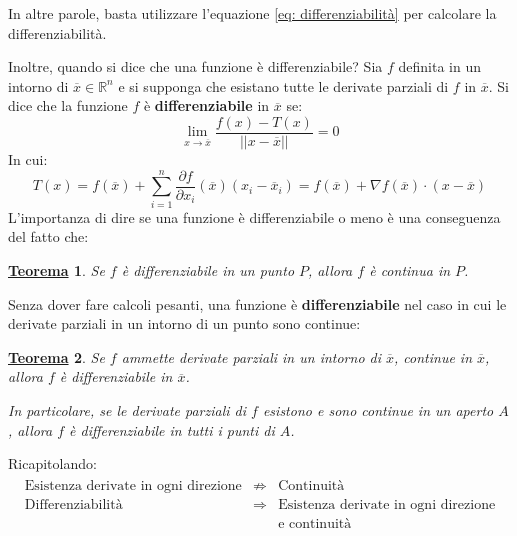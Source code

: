 \documentclass[a4paper]{article}
\newtheorem{theorem}{\textcolor{Red3}{\underline{Teorema}}}
\newcommand{\definition}[1]{\textcolor{Red3}{\textbf{#1}}}
\begin{document}
	\noindent
	In altre parole, basta utilizzare l'equazione \ref{eq: differenziabilità} per calcolare la differenziabilità.\newline

	\noindent
	Inoltre, quando si dice che una funzione è differenziabile? Sia $f$ definita in un intorno di $\overline{x} \in \mathbb{R}^{n}$ e si supponga che esistano tutte le derivate parziali di $f$ in $\overline{x}$. Si dice che la funzione $f$ è \definition{differenziabile} in $\overline{x}$ se:
	\begin{equation*}
		\displaystyle\lim_{x \rightarrow \overline{x}} \dfrac{f\left(x\right) - T\left(x\right)}{\left|\left| x-\overline{x} \right|\right|} = 0
	\end{equation*}
	In cui:
	\begin{equation*}
		T\left(x\right) = f\left(\overline{x}\right) + \displaystyle\sum_{i=1}^{n}\dfrac{\partial f}{\partial x_{i}} \left(\overline{x}\right)\left(x_{i} - \overline{x}_{i}\right) = f\left(\overline{x}\right) + \nabla f\left(\overline{x}\right) \cdot \left(x-\overline{x}\right)
	\end{equation*}
	L'importanza di dire se una funzione è differenziabile o meno è una conseguenza del fatto che:
	\begin{theorem}
		Se $f$ è differenziabile in un punto $P$, allora $f$ è continua in $P$.
	\end{theorem}

	\noindent
	Senza dover fare calcoli pesanti, una funzione è \textbf{differenziabile} nel caso in cui le derivate parziali in un intorno di un punto sono continue:
	\begin{theorem}
		Se $f$ ammette derivate parziali in un intorno di $\overline{x}$, continue in $\overline{x}$, allora $f$ è differenziabile in $\overline{x}$.

		In particolare, se le derivate parziali di $f$ esistono e sono continue in un aperto $A$, allora $f$ è differenziabile in tutti i punti di $A$.
	\end{theorem}

	\noindent
	Ricapitolando:
	\begin{gather*}
		\begin{array}{rcl}
			\text{Esistenza derivate in ogni direzione} &\nRightarrow& \text{Continuità} \\ [.3em]
			\text{Differenziabilità} &\Rightarrow& \text{Esistenza derivate in ogni direzione} \\
			&& \text{e continuità}
		\end{array}
	\end{gather*}\newpage
\end{document}
